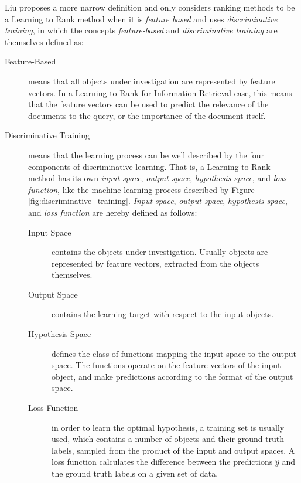 Liu \cite{Liu2007} proposes a more narrow definition and only considers ranking methods to be a Learning to Rank method when it is \emph{feature based} and uses \emph{discriminative training}, in which the concepts \emph{feature-based} and \emph{discriminative training} are themselves defined as:
\begin{description}
\item[Feature-Based]{means that all objects under investigation are represented by feature vectors. In a Learning to Rank for Information Retrieval case, this means that the feature vectors can be used to predict the relevance of the documents to the query, or the importance of the document itself.}
\item[Discriminative Training]{means that the learning process can be well described by the four components of discriminative learning. That is, a Learning to Rank method has its own \emph{input space}, \emph{output space}, \emph{hypothesis space}, and \emph{loss function}, like the machine learning process described by Figure \ref{fig:discriminative_training}. \emph{Input space}, \emph{output space}, \emph{hypothesis space}, and \emph{loss function} are hereby defined as follows:
	\begin{description}
	\item[Input Space]{contains the objects under investigation. Usually objects are represented by feature vectors, extracted from the objects themselves.}
	\item[Output Space]{contains the learning target with respect to the input objects.}
	\item[Hypothesis Space]{defines the class of functions mapping the input space to the output space. The functions operate on the feature vectors of the input object, and make predictions according to the format of the output space.}
	\item[Loss Function]{in order to learn the optimal hypothesis, a training set is usually used, which contains a number of objects and their ground truth labels, sampled from the product of the input and output spaces. A loss function calculates the difference between the predictions $\hat{y}$ and the ground truth labels on a given set of data.}
	\end{description}
	}
\end{description}


